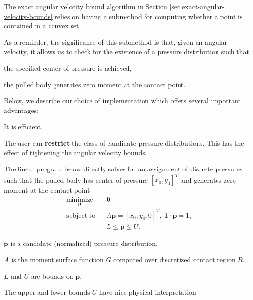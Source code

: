 \documentclass[conference]{IEEEtran}
\begin{document}
\begin{inparaenum}
\item The exact angular velocity bound algorithm in Section
  \ref{sec:exact-angular-velocity-bounds} relies on having a submethod
  for computing whether a point is contained in a convex set.
\item As a reminder, the significance of this submethod is that, given
  an angular velocity, it allows us to check for the existence of a
  pressure distribution such that
  \begin{inparaenum}
  \item the specified center of pressure is achieved,
  \item the pulled body generates zero moment at the contact point.
  \end{inparaenum}
\item Below, we describe our choice of implementation which offers
  several important advantages:
  \begin{inparaenum}
  \item It is efficient,
  \item The user can \textbf{restrict} the class of candidate pressure
    distributions. This has the effect of tightening the angular
    velocity bounds.
  \end{inparaenum}
\item The linear program below directly solves for an assignment of
  discrete pressures such that the pulled body has center of pressure
  $[x_0,y_0]^T$ and generates zero moment at the contact point
  \begin{equation}
    \begin{aligned}
      & \underset{\mathbf{p}}{\text{minimize}}
      & & \mathbf{0} \\
      & \text{subject to}
      & & A\mathbf{p} = [x_0,y_0,0]^T,\; \mathbf{1}\cdot\mathbf{p} = 1, \\
      & & & L \leq \mathbf{p} \leq U.
    \end{aligned} \label{eq:lin-prog-PiCH}
  \end{equation}
  \begin{inparaenum}
  \item $\mathbf{p}$ is a candidate (normalized) pressure distribution,
  \item $A$ is the moment surface function $G$ computed over
    discretized contact region $R$,
  \item $L$ and $U$ are bounds on $\mathbf{p}$.
  \end{inparaenum}
\item The upper and lower bounds $U$ have nice physical interpretation 

\end{inparaenum}
\end{document}
